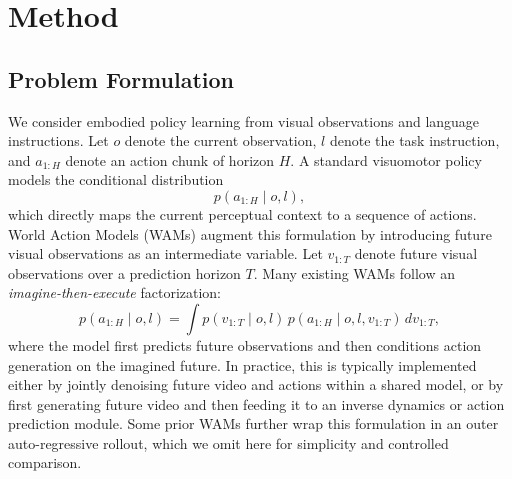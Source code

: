 \documentclass{article}
\begin{document}
\section{Method}
\subsection{Problem Formulation}

We consider embodied policy learning from visual observations and language instructions. Let $o$ denote the current observation, $l$ denote the task instruction, and $a_{1:H}$ denote an action chunk of horizon $H$. A standard visuomotor policy models the conditional distribution
\begin{equation}
    p(a_{1:H} \mid o, l),
\end{equation}
which directly maps the current perceptual context to a sequence of actions. World Action Models (WAMs) augment this formulation by introducing future visual observations as an intermediate variable. Let $v_{1:T}$ denote future visual observations over a prediction horizon $T$. Many existing WAMs follow an \emph{imagine-then-execute} factorization:
\begin{equation}
    p(a_{1:H} \mid o, l)
    =
    \int p(v_{1:T} \mid o, l)\,
    p(a_{1:H} \mid o, l, v_{1:T})\, dv_{1:T},
\end{equation}
where the model first predicts future observations and then conditions action generation on the imagined future. In practice, this is typically implemented either by jointly denoising future video and actions within a shared model, or by first generating future video and then feeding it to an inverse dynamics or action prediction module. Some prior WAMs further wrap this formulation in an outer auto-regressive rollout, which we omit here for simplicity and controlled comparison.
\end{document}
